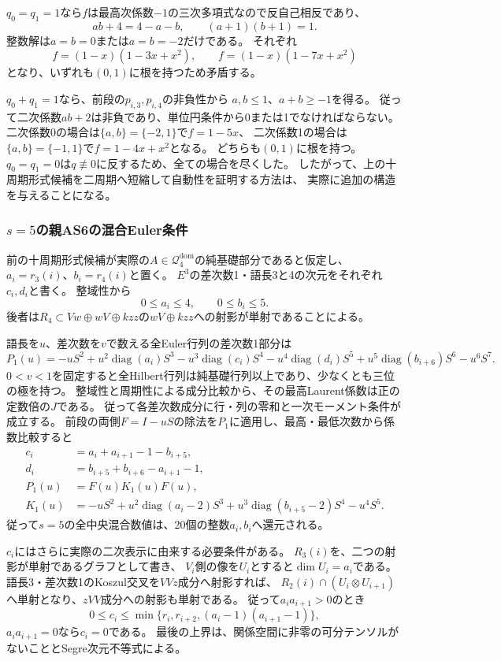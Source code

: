 \documentclass[11pt,a4paper]{ltjsarticle}
\begin{document}
$q_0=q_1=1$なら$f$は最高次係数$-1$の三次多項式なので反自己相反であり、
\[
ab+4=4-a-b,\qquad (a+1)(b+1)=1.
\]
整数解は$a=b=0$または$a=b=-2$だけである。
それぞれ
\[
f=(1-x)(1-3x+x^2),\qquad f=(1-x)(1-7x+x^2)
\]
となり、いずれも$(0,1)$に根を持つため矛盾する。

$q_0+q_1=1$なら、前段の$p_{i,3},p_{i,4}$の非負性から
$a,b\le1$、$a+b\ge-1$を得る。
従って二次係数$ab+2$は非負であり、単位円条件から0または1でなければならない。
二次係数0の場合は$\{a,b\}=\{-2,1\}$で$f=1-5x$、
二次係数1の場合は$\{a,b\}=\{-1,1\}$で$f=1-4x+x^2$となる。
どちらも$(0,1)$に根を持つ。
$q_0=q_1=0$は$q\not\equiv0$に反するため、全ての場合を尽くした。
したがって、上の十周期形式候補を二周期へ短縮して自動性を証明する方法は、
実際に追加の構造を与えることになる。

\subsubsection{\texorpdfstring{$s=5$}{s=5}の親AS6の混合Euler条件}
\label{note:n4-parent-mixed-obstruction}
前の十周期形式候補が実際の$A\in\mathcal Q_4^{\mathrm{dom}}$の純基礎部分であると仮定し、
$a_i=r_3(i)$、$b_i=r_4(i)$と置く。
$E^3$の差次数1・語長3と4の次元をそれぞれ$c_i,d_i$と書く。
整域性から
\[
0\le a_i\le4,\qquad 0\le b_i\le5.
\]
後者は$R_4\subset Vw\oplus wV\oplus kzz$の$wV\oplus kzz$への射影が単射であることによる。

語長を$u$、差次数を$v$で数える全Euler行列の差次数1部分は
\[
P_1(u)=-uS^2+u^2\operatorname{diag}(a_i)S^3
-u^3\operatorname{diag}(c_i)S^4-u^4\operatorname{diag}(d_i)S^5
+u^5\operatorname{diag}(b_{i+6})S^6-u^6S^7.
\]
$0<v<1$を固定すると全Hilbert行列は純基礎行列以上であり、少なくとも三位の極を持つ。
整域性と周期性による成分比較から、その最高Laurent係数は正の定数倍の$J$である。
従って各差次数成分に行・列の零和と一次モーメント条件が成立する。
前段の両側$F=I-uS$の除法を$P_1$に適用し、最高・最低次数から係数比較すると
\begin{align*}
c_i&=a_i+a_{i+1}-1-b_{i+5},\\
d_i&=b_{i+5}+b_{i+6}-a_{i+1}-1,\\
P_1(u)&=F(u)K_1(u)F(u),\\
K_1(u)&=-uS^2+u^2\operatorname{diag}(a_i-2)S^3
+u^3\operatorname{diag}(b_{i+5}-2)S^4-u^4S^5.
\end{align*}
従って$s=5$の全中央混合数値は、20個の整数$a_i,b_i$へ還元される。

$c_i$にはさらに実際の二次表示に由来する必要条件がある。
$R_3(i)$を、二つの射影が単射であるグラフとして書き、
$V_i$側の像を$U_i$とすると$\dim U_i=a_i$である。
語長3・差次数1のKoszul交叉を$VVz$成分へ射影すれば、
$R_2(i)\cap(U_i\otimes U_{i+1})$へ単射となり、$zVV$成分への射影も単射である。
従って$a_i a_{i+1}>0$のとき
\[
0\le c_i\le\min\{r_i,r_{i+2},(a_i-1)(a_{i+1}-1)\},
\]
$a_i a_{i+1}=0$なら$c_i=0$である。
最後の上界は、関係空間に非零の可分テンソルがないこととSegre次元不等式による。
\end{document}
